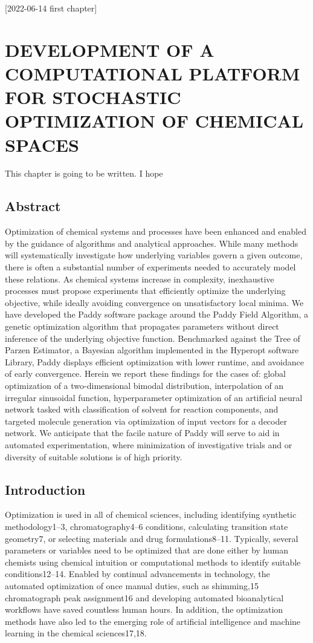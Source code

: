 [2022-06-14 first chapter]

\chapter{DEVELOPMENT  OF  A  COMPUTATIONAL  PLATFORM  FOR  STOCHASTIC  OPTIMIZATION  OF CHEMICAL SPACES}

This chapter is going to be written. I hope

\section{Abstract}
Optimization of chemical systems and processes have been enhanced and enabled by the guidance of algorithms and analytical approaches.  While many methods will systematically investigate how underlying variables govern a given outcome, there is often a substantial number of experiments needed to accurately model these relations.  As chemical systems increase in complexity, inexhaustive processes must propose experiments that efficiently optimize the underlying objective, while ideally avoiding convergence on unsatisfactory local minima.  We have developed the Paddy software package around the Paddy Field Algorithm, a genetic optimization algorithm that propagates parameters  without direct inference of the underlying objective function.  Benchmarked against the Tree of Parzen Estimator, a Bayesian algorithm implemented in the Hyperopt software Library, Paddy displays efficient optimization with lower runtime, and avoidance of early convergence.  Herein we report these findings for the cases of: global optimization of a two-dimensional bimodal distribution, interpolation of an irregular sinusoidal function, hyperparameter optimization of an artificial neural network tasked with classification of solvent for reaction components, and targeted molecule generation via optimization of input vectors for a decoder network.  We anticipate that the facile nature of Paddy will serve to aid in automated experimentation, where minimization of investigative trials and or diversity of suitable solutions is of high priority. 

\section{Introduction}
Optimization is used in all of chemical sciences, including identifying synthetic methodology1–3, chromatography4–6 conditions, calculating transition state geometry7, or selecting materials and drug formulations8–11.  Typically, several parameters or variables need to be optimized that are done either by human chemists using chemical intuition or computational methods to identify suitable conditions12–14.  Enabled by continual advancements in technology, the automated optimization of once manual duties, such as shimming,15 chromatograph peak assignment16 and developing automated bioanalytical workflows have saved countless human hours.  In addition, the optimization methods have also led to the emerging role of artificial intelligence and machine learning in the chemical sciences17,18.  

